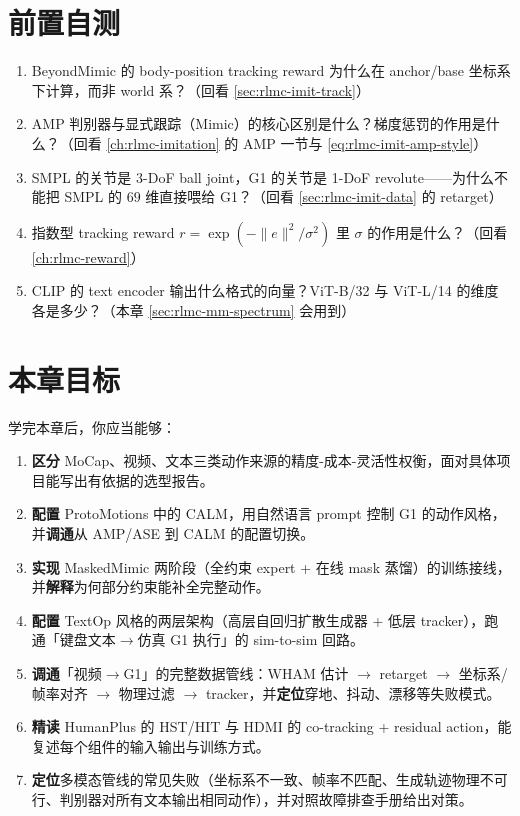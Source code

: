 \section*{前置自测}
\label{sec:rlmc-mm-pretest}

\begin{practice}
\begin{enumerate}
  \item BeyondMimic 的 body-position tracking reward 为什么在 anchor/base 坐标系下计算，而非 world 系？（回看 \cref{sec:rlmc-imit-track}）
  \item AMP 判别器与显式跟踪（Mimic）的核心区别是什么？梯度惩罚的作用是什么？（回看 \cref{ch:rlmc-imitation} 的 AMP 一节与 \cref{eq:rlmc-imit-amp-style}）
  \item SMPL 的关节是 3-DoF ball joint，G1 的关节是 1-DoF revolute——为什么不能把 SMPL 的 $69$ 维直接喂给 G1？（回看 \cref{sec:rlmc-imit-data} 的 retarget）
  \item 指数型 tracking reward $r=\exp(-\|e\|^2/\sigma^2)$ 里 $\sigma$ 的作用是什么？（回看 \cref{ch:rlmc-reward}）
  \item CLIP 的 text encoder 输出什么格式的向量？ViT-B/32 与 ViT-L/14 的维度各是多少？（本章 \cref{sec:rlmc-mm-spectrum} 会用到）
\end{enumerate}
\end{practice}

\section*{本章目标}
\label{sec:rlmc-mm-goals}

学完本章后，你应当能够：

\begin{enumerate}
  \item \textbf{区分} MoCap、视频、文本三类动作来源的精度-成本-灵活性权衡，面对具体项目能写出有依据的选型报告。
  \item \textbf{配置} ProtoMotions 中的 CALM，用自然语言 prompt 控制 G1 的动作风格，并\textbf{调通}从 AMP/ASE 到 CALM 的配置切换。
  \item \textbf{实现} MaskedMimic 两阶段（全约束 expert + 在线 mask 蒸馏）的训练接线，并\textbf{解释}为何部分约束能补全完整动作。
  \item \textbf{配置} TextOp 风格的两层架构（高层自回归扩散生成器 + 低层 tracker），跑通「键盘文本$\to$仿真 G1 执行」的 sim-to-sim 回路。
  \item \textbf{调通}「视频$\to$G1」的完整数据管线：WHAM 估计 $\to$ retarget $\to$ 坐标系/帧率对齐 $\to$ 物理过滤 $\to$ tracker，并\textbf{定位}穿地、抖动、漂移等失败模式。
  \item \textbf{精读} HumanPlus 的 HST/HIT 与 HDMI 的 co-tracking + residual action，能复述每个组件的输入输出与训练方式。
  \item \textbf{定位}多模态管线的常见失败（坐标系不一致、帧率不匹配、生成轨迹物理不可行、判别器对所有文本输出相同动作），并对照故障排查手册给出对策。
\end{enumerate}

